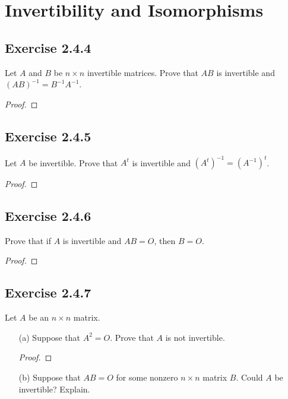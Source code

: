 \section{Invertibility and Isomorphisms}

\subsection*{Exercise 2.4.4} Let \( A  \) and \( B  \) be \( n \times n  \) invertible matrices. Prove that \( AB  \) is invertible and \( (AB)^{-1} = B^{-1} A^{-1} \).
\begin{proof}

\end{proof}

\subsection*{Exercise 2.4.5} Let \( A  \) be invertible. Prove that \( A^{t}  \) is invertible and \( (A^{t})^{-1} = (A^{-1})^{t} \).
\begin{proof}

\end{proof}

\subsection*{Exercise 2.4.6} Prove that if \( A  \) is invertible and \( AB = O  \), then \( B = O  \).
\begin{proof}

\end{proof}

\subsection*{Exercise 2.4.7} Let \( A  \) be an \( n \times n  \) matrix.
\begin{enumerate}
    \item[(a)] Suppose that \( A^{2} = O  \). Prove that \( A  \) is not invertible.
        \begin{proof}
        
        \end{proof}
    \item[(b)] Suppose that \( AB = O  \) for some nonzero \( n \times n  \) matrix \( B  \). Could \( A  \) be invertible? Explain.
        \begin{solution}
        
        \end{solution}
\end{enumerate}

